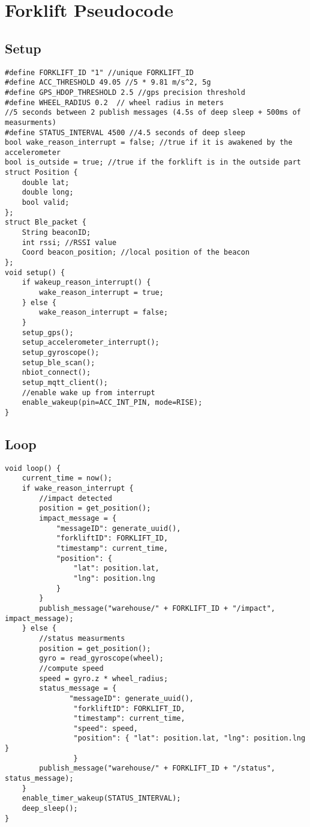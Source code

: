\pagebreak
\section{Forklift Pseudocode}
\subsection{Setup}
\begin{verbatim}
#define FORKLIFT_ID "1" //unique FORKLIFT_ID 
#define ACC_THRESHOLD 49.05 //5 * 9.81 m/s^2, 5g
#define GPS_HDOP_THRESHOLD 2.5 //gps precision threshold 
#define WHEEL_RADIUS 0.2  // wheel radius in meters
//5 seconds between 2 publish messages (4.5s of deep sleep + 500ms of measurments)
#define STATUS_INTERVAL 4500 //4.5 seconds of deep sleep
bool wake_reason_interrupt = false; //true if it is awakened by the accelerometer
bool is_outside = true; //true if the forklift is in the outside part
struct Position {
    double lat;
    double long;
    bool valid;
};
struct Ble_packet {
    String beaconID;
    int rssi; //RSSI value
    Coord beacon_position; //local position of the beacon
};
void setup() {
    if wakeup_reason_interrupt() {
        wake_reason_interrupt = true;
    } else {
        wake_reason_interrupt = false;
    } 
    setup_gps();
    setup_accelerometer_interrupt();
    setup_gyroscope();
    setup_ble_scan();
    nbiot_connect();
    setup_mqtt_client();
    //enable wake up from interrupt
    enable_wakeup(pin=ACC_INT_PIN, mode=RISE);
}
\end{verbatim}
\pagebreak
\subsection{Loop}
\begin{verbatim}
void loop() {
    current_time = now();
    if wake_reason_interrupt {
        //impact detected
        position = get_position();
        impact_message = {
            "messageID": generate_uuid(),
            "forkliftID": FORKLIFT_ID,
            "timestamp": current_time,
            "position": {
                "lat": position.lat,
                "lng": position.lng
            }
        }
        publish_message("warehouse/" + FORKLIFT_ID + "/impact", impact_message);
    } else {
        //status measurments
        position = get_position();
        gyro = read_gyroscope(wheel);
        //compute speed
        speed = gyro.z * wheel_radius;
        status_message = {
               "messageID": generate_uuid(),
                "forkliftID": FORKLIFT_ID,
                "timestamp": current_time,
                "speed": speed,
                "position": { "lat": position.lat, "lng": position.lng }
                }
        publish_message("warehouse/" + FORKLIFT_ID + "/status", status_message);
    }
    enable_timer_wakeup(STATUS_INTERVAL);
    deep_sleep();
}
\end{verbatim}
\pagebreak
